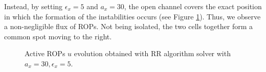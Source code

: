 Instead, by setting $\epsilon_x = 5$ and $a_x = 30$, the open channel covers the exact position in which the formation of the instabilities occurs (see Figure \ref{fig:a30epsi5}). Thus, we observe a non-negligible flux of ROPs. Not being isolated, the two cells together form a common spot moving to the right.
\begin{figure}[H]
    \centering
    \quad
    \quad
    \quad
    \quad
    \quad
    \quad
    \caption[Tuning channel prm - $a_x = 30, \epsilon_x = 5$]{Active ROPs $u$ evolution obtained with RR algorithm solver with $a_x = 30, \epsilon_x = 5$.}
    \label{fig:a30epsi5}
\end{figure}

